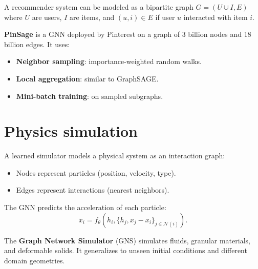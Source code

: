 \begin{definition}
A recommender system can be modeled as a bipartite graph
$G = (U \cup I, E)$ where $U$ are users, $I$ are items, and
$(u, i) \in E$ if user $u$ interacted with item $i$.
\end{definition}

\begin{example}
\textbf{PinSage} is a GNN deployed by Pinterest on a graph of
3 billion nodes and 18 billion edges. It uses:
\begin{itemize}
  \item \textbf{Neighbor sampling}: importance-weighted random walks.
  \item \textbf{Local aggregation}: similar to GraphSAGE.
  \item \textbf{Mini-batch training}: on sampled subgraphs.
\end{itemize}
\end{example}

\section{Physics simulation}
\label{sec:physics}

\begin{definition}
A learned simulator models a physical system as an interaction
graph:
\begin{itemize}
  \item Nodes represent particles (position, velocity, type).
  \item Edges represent interactions (nearest neighbors).
\end{itemize}
The GNN predicts the acceleration of each particle:
\[
  \ddot{x}_i = f_\theta\!\left(h_i,
  \{h_j, x_j - x_i\}_{j \in \mathcal{N}(i)}\right).
\]
\end{definition}

\begin{example}
The \textbf{Graph Network Simulator} (GNS) simulates fluids,
granular materials, and deformable solids. It generalizes to
unseen initial conditions and different domain geometries.
\end{example}

